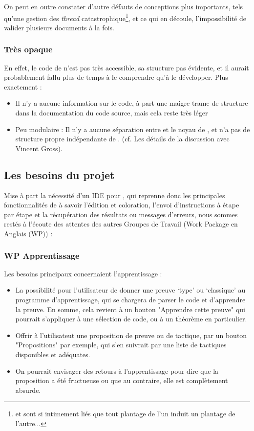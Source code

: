         On peut en outre constater d'autre défauts de conceptions plus importants, tels qu'une gestion des \emph{thread} catastrophique\footnote{\coqtop{} et \coqide{} sont si intimement liés que tout plantage de l'un induit un plantage de l'autre...}, et ce qui en découle, l'impossibilité de valider plusieurs documents à la fois.
			
        \subsubsection{Très opaque}

		En effet, le code de \coqide{} n'est pas très accessible, sa structure pas évidente, et il aurait probablement fallu plus de temps à le comprendre qu'à le développer. Plus exactement :
		\begin{itemize}
			\item Il n'y a aucune information sur le code, à part une maigre trame de structure dans la documentation du code source, mais cela reste très léger
			\item Peu modulaire : Il n'y a aucune séparation entre \coqide{} et le noyau de \coq{}, et \coqide{} n'a pas de structure propre indépendante de \coq{}. (cf. Les détails de la discussion avec Vincent Gross).	
		\end{itemize}
		
	\subsection{Les besoins du projet \coquille}

		Mise à part la nécessité d'un IDE pour \coq{}, qui reprenne donc les principales fonctionnalités de \coqide{} à savoir l'édition et coloration, l'envoi d'instructions à \coqtop{} étape par étape et la récupération des résultats ou messages d'erreurs, nous sommes restés à l'écoute des attentes des autres Groupes de Travail (Work Package en Anglais (WP)) :
        
        \subsubsection{WP Apprentissage}

        Les besoins principaux concernaient l'apprentissage :
		\begin{itemize}
			\item La possibilité pour l'utilisateur de donner une preuve `type' ou `classique' au programme d'apprentissage, qui se chargera de parser le code et d'apprendre la preuve. En somme, cela revient à un bouton "Apprendre cette preuve" qui pourrait s'appliquer à une sélection de code, ou à un théorème en particulier.
			\item Offrir à l'utilisateut une proposition de preuve ou de tactique, par un bouton "Propositions" par exemple, qui s'en suivrait par une liste de tactiques disponibles et adéquates.
			\item On pourrait envisager des retours à l'apprentissage pour dire que la proposition a été fructueuse ou que au contraire, elle est complètement absurde.
		\end{itemize}
			
